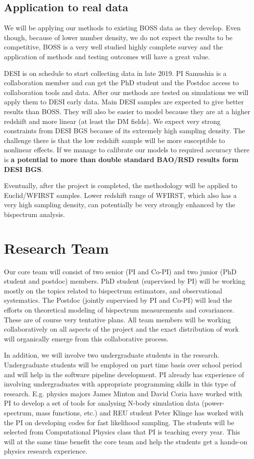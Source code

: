 \subsection*{Application to real data}

We will be applying our methods to existing BOSS data as they develop. Even
though, because of lower number density, we do not expect the results to be
competitive, BOSS is a very well studied highly complete survey and the
application of methods and testing outcomes will have a great value. 

DESI is on schedule to start collecting data in late 2019. PI Samushia is a
collaboration member and can get the PhD student and the Postdoc access to
collaboration tools and data. After our methods are tested on
simulations we will apply them to DESI early data. Main DESI samples
are expected to give better results than BOSS. They will also be easier to
model because they are at a higher redshift and more linear (at least the DM
fields). We expect very strong constraints from DESI BGS because of its
extremely high sampling density. The challenge there is that the low redshift
sample will be more susceptible to nonlinear effects. If we manage to calibrate
our models to required accuracy there is \textbf{a potential to more than double
standard BAO/RSD results form DESI BGS}.

Eventually, after the project is completed, the methodology will be applied to
Euclid/WFIRST samples. Lower redshift range of WFIRST, which also has a very
high sampling density, can potentially be very strongly enhanced by the
bispectrum analysis.

\section{Research Team}

Our core team will consist of two senior (PI and Co-PI) and two junior (PhD
student and postdoc) members. PhD student (supervised by PI) will be working
mostly on the topics related to bispectrum estimators, and observational
systematics. The Postdoc (jointly supervised by PI and Co-PI) will lead the
efforts on theoretical modeling of bispectrum measurements and covariances.
These are of course very tentative plans. All team members will be working
collaboratively on all aspects of the project and the exact distribution of
work will organically emerge from this collaborative process. 

In addition, we will involve two undergraduate students in the research.
Undergraduate students will be employed on part time basis over school period
and will help in the software pipeline development. PI already has experience
of involving undergraduates with appropriate programming skills in this type of
research. E.g. physics majors James Minton and David Coria have worked with PI
to develop a set of tools for analysing N-body simulation data (power-spectrum,
mass functions, etc.) and REU student Peter Klinge has worked with
the PI on developing codes for fast likelihood sampling. The students will be
selected from Computational Physics class that PI is teaching every year. This
will at the same time benefit the core team and help the students get a
hands-on physics research experience.

